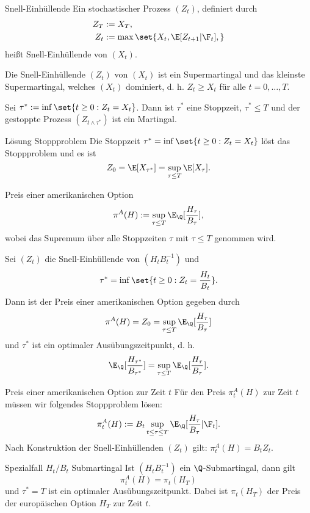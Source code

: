 \begin{karte}{Snell-Einhüllende}
Ein stochastischer Prozess \((Z_t)\), definiert durch 
\begin{align*}
    Z_T &:= X_T, \\
    Z_t &:= \max\set{ X_t, \E[Z_{t+1} | \F_t], }
\end{align*}
heißt Snell-Einhüllende von \((X_t)\).

Die Snell-Einhüllende \((Z_t)\) von \((X_t)\) ist ein Supermartingal und das kleinste 
Supermartingal, welches \((X_t)\) dominiert, d. h. \(Z_t \geq X_t\) für alle \(t=0,\ldots, T\).

Sei \(\tau^* := \inf \set{t\geq 0: Z_t = X_t}\). Dann ist 
\(\tau^* \) eine Stoppzeit, \(\tau^* \leq T\) und der gestoppte Prozess 
\((Z_{t\wedge \tau^*})\) ist ein Martingal.
\end{karte}

\begin{karte}{Lösung Stoppproblem}
Die Stoppzeit \(\tau^* = \inf \set{t\geq 0: Z_t = X_t}\) löst das Stoppproblem 
und es ist 
\[ Z_0 = \E[X_{\tau^*}] = \sup_{\tau \leq T} \E[X_\tau]. \]
\end{karte}

\begin{karte}{Preis einer amerikanischen Option}
\[ \pi^A(H) := \sup_{\tau \leq T} \E_\Q[\frac{H_\tau}{B_\tau}],\]
wobei das Supremum über alle Stoppzeiten \(\tau\) mit \(\tau \leq T\) genommen wird.

Sei \((Z_t)\) die Snell-Einhüllende von \((H_t B_t^{-1})\) und 
\[ \tau^* = \inf \set{t\geq 0: Z_t = \frac{H_t}{B_t}}. \]
Dann ist der Preis einer amerikanischen Option gegeben durch 
\[ \pi^A(H) = Z_0 = \sup_{\tau \leq T} \E_\Q [\frac{H_\tau}{B_\tau}] \]
und \(\tau^*\) ist ein optimaler Ausübungszeitpunkt, d. h. 
\[ \E_\Q[\frac{H_{\tau^*}}{B_{\tau^*}}] = \sup_{\tau \leq T} \E_\Q [\frac{H_\tau}{B_\tau}]. \]
\end{karte}

\begin{karte}{Preis einer amerikanischen Option zur Zeit \(t\)}
Für den Preis \(\pi_t^A(H)\) zur Zeit \(t\) müssen wir folgendes Stoppproblem lösen: 
\[ \pi_t^A(H) := B_t \sup_{t\leq \tau \leq T} \E_\Q[\frac{H_\tau}{B_\tau} | \F_t]. \]
Nach Konstruktion der Snell-Einhüllenden \((Z_t)\) gilt: \(\pi_t^A(H) = B_t Z_t\).
\end{karte}

\begin{karte}{Spezialfall \(H_t/B_t\) Submartingal}
Ist \((H_t B_t^{-1})\) ein \(\Q\)-Submartingal, dann gilt 
\[ \pi_t^A(H) = \pi_t(H_T) \]
und \(\tau^* = T\) ist ein optimaler Ausübungszeitpunkt. 
Dabei ist \(\pi_t(H_T)\) der Preis der europäischen Option \(H_T\) zur Zeit \(t\).
\end{karte}

